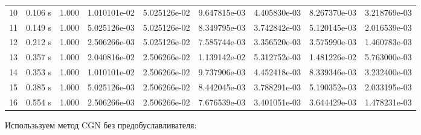 \documentclass[12pt]{article}
\begin{document}
\begin{center}
\begin{tabular}{lllllllll}
10&      0.106 s&      1.000&      1.010101e-02&      5.025126e-02&      9.647815e-03&      4.405830e-03&      8.267370e-03&      3.218769e-03\\
11&      0.149 s&      1.000&      5.025126e-03&      5.025126e-02&      8.349795e-03&      3.742842e-03&      5.120145e-03&      2.016539e-03\\
12&      0.212 s&      1.000&      2.506266e-03&      5.025126e-02&      7.585744e-03&      3.356520e-03&      3.575990e-03&      1.460783e-03\\
13&      0.357 s&      1.000&      2.040816e-02&      2.506266e-02&      1.139142e-02&      5.312752e-03&      1.481226e-02&      5.763000e-03\\
14&      0.353 s&      1.000&      1.010101e-02&      2.506266e-02&      9.737906e-03&      4.452418e-03&      8.339346e-03&      3.232400e-03\\
15&      0.385 s&      1.000&      5.025126e-03&      2.506266e-02&      8.442045e-03&      3.788291e-03&      5.190352e-03&      2.033195e-03\\
16&      0.554 s&      1.000&      2.506266e-03&      2.506266e-02&      7.676539e-03&      3.401051e-03&      3.644429e-03&      1.478231e-03\\
\end{tabular}
\end{center}

Использьзуем метод CGN без предобуславливателя:
\end{document}
